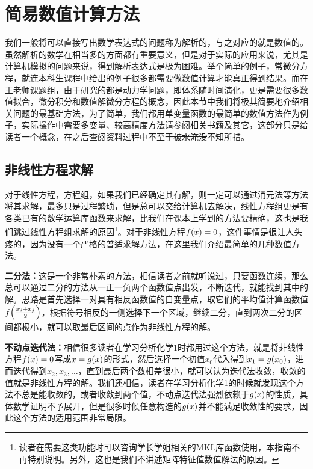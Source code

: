 \documentclass[12pt,a4paper,openany,twoside]{book}
\numberwithin{equation}{section}
\begin{document}
      \section{简易数值计算方法}
    我们一般将可以直接写出数学表达式的问题称为解析的，与之对应的就是数值的。虽然解析的数学在相当多的方面都有重要意义，但是对于实际的应用来说，尤其是计算机模拟的问题来说，得到解析表达式是极为困难。举个简单的例子，常微分方程，就连本科生课程中给出的例子很多都需要做数值计算才能真正得到结果。而在王老师课题组，由于研究的都是动力学问题，即体系随时间演化，更是需要很多数值拟合，微分积分和数值解微分方程的概念，因此本节中我们将极其简要地介绍相关问题的最基础方法，为了简单，我们都用单变量函数的最简单的数值方法作为例子，实际操作中需要多变量、较高精度方法请参阅相关书籍\cite{numerical_calc_methods}及其它，这部分只是给读者一个概念，在之后查阅资料过程中不至于\sout{被水淹没}不知所措。
    \subsection{非线性方程求解}
      对于线性方程，方程组，如果我们已经确定其有解，则一定可以通过消元法等方法将其求解，最多只是过程繁琐，但是总可以交给计算机去解决，线性方程组更是有各类已有的数学运算库函数来求解，比我们在课本上学到的方法要精确，这也是我们跳过线性方程组求解的原因\footnote{读者在需要这类功能时可以咨询学长学姐相关的MKL库函数使用，本指南不再特别说明。另外，这也是我们不讲述矩阵特征值数值解法的原因。}。对于非线性方程$f\qty(x)=0$，这件事情是很让人头疼的，因为没有一个严格的普适求解方法，在这里我们介绍最简单的几种数值方法。

      \textbf{二分法：}这是一个非常朴素的方法，相信读者之前就听说过，只要函数连续，那么总可以通过二分的方法从一正一负两个函数值点出发，不断迭代，就能找到其中的解。思路是首先选择一对具有相反函数值的自变量点，取它们的平均值计算函数值$f\qty(\frac{x_i+x_j}{2})$，根据符号相反的一侧选择下一个区域，继续二分，直到两次二分的区间都极小，就可以取最后区间的点作为非线性方程的解。

      \textbf{不动点迭代法：}相信很多读者在学习分析化学1时都用过这个方法，就是将非线性方程$f\qty(x)=0$写成$x=g\qty(x)$的形式，然后选择一个初值$x_0$代入得到$x_1=g\qty(x_0)$，进而迭代得到$x_2,x_3,\dots$，直到最后两个数相差很小，就可以认为迭代法收敛，收敛的值就是非线性方程的解。我们还相信，读者在学习分析化学1的时候就发现这个方法不总是能收敛的，或者收敛到两个值，不动点迭代法强烈依赖于$g\qty(x)$的性质，具体数学证明不予展开，但是很多时候任意构造的$g\qty(x)$并不能满足收敛性的要求，因此这个方法的适用范围非常局限。
\end{document}

